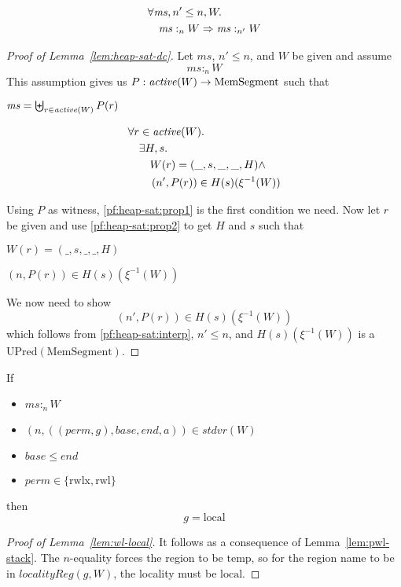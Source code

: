 \documentclass[a4paper]{article}
\newcommand{\fun}{\rightarrow}
\newcommand{\var}[1]{\mathit{#1}}
\newcommand{\hs}{\var{ms}}
\newcommand{\ms}{\hs}
\newcommand{\gl}{\var{g}}
\newcommand{\addr}{\var{a}}
\newcommand{\start}{\var{base}}
\newcommand{\addrend}{\var{end}}
\newcommand{\heap}{\var{mem}}
\newcommand{\perm}{\var{perm}}
\newcommand{\stdcap}[1][(\perm,\gl)]{\left(#1,\start,\addrend,\addr \right)}
\newcommand{\plainfun}[2]{
  \ifthenelse{\equal{#2}{}}
  {\mathit{#1}}
  {\mathit{#1}(#2)}
}
\newcommand{\activeReg}[1]{\plainfun{active}{#1}}
\newcommand{\heapSat}[3][\heap]{#1 :_{#2} #3}
\newcommand{\memSat}[3][n]{\heapSat[#2]{#1}{#3}}
\newcommand{\plaindom}[1]{\mathrm{#1}}
\newcommand{\HeapSegments}{\plaindom{MemSegment}}
\newcommand{\MemSegments}{\HeapSegments}
\newcommand{\UPred}[1]{\plaindom{UPred}(#1)}
\newcommand{\npair}[2][n]{\left(#1,#2 \right)}
\newcommand{\plainperm}[1]{\mathrm{#1}}
\newcommand{\readwritel}{\plainperm{rwl}}
\newcommand{\rwl}{\readwritel}
\newcommand{\rwlx}{\plainperm{rwlx}}
\newcommand{\local}{\plainperm{local}}
\newcommand{\localityReg}{\var{localityReg}}
\newcommand{\plainview}[1]{\mathrm{#1}}
\newcommand{\temp}{\plainview{temp}}
\begin{document}
\begin{lemma}
  \label{lem:heap-sat-dc}
  \begin{align*}
    &\forall \hs, n' \leq n, W \ldotp \\
    &\quad \heapSat[\hs]{n}{W} \Rightarrow \heapSat[\hs]{n'}{W}
  \end{align*}
\end{lemma} 
\begin{proof}[Proof of Lemma~\ref{lem:heap-sat-dc}]
  Let $\ms$, $n' \leq n$, and $W$ be given and assume
  \[
    \heapSat[\hs]{n}{W}
  \]
  This assumption gives us $P : \activeReg{W} \fun \MemSegments$ such that
  \begin{enumproof}
    \item $\hs = \biguplus_{r\in\activeReg{W}}P(r)$ \label{pf:heap-sat:prop1}
    \item \label{pf:heap-sat:prop2}
      \begin{align*}
        &\forall r \in \activeReg{W} \ldotp\\
        &\quad \exists H,s \ldotp\\
        &\qquad W(r) = (\_,s,\_,\_,H) \land \\
        &\qquad \npair[n']{P(r)} \in H(s)(\xi^{-1}(W))
      \end{align*}
  \end{enumproof}
  Using $P$ as witness, \ref{pf:heap-sat:prop1} is the first condition we need. Now let $r$ be given and use \ref{pf:heap-sat:prop2} to get $H$ and $s$ such that
  \begin{enumproof}[resume]
    \item $W(r) = (\_,s,\_,\_,H)$ 
    \item $\npair[n]{P(r)} \in H(s)(\xi^{-1}(W))$ \label{pf:heap-sat:interp}
  \end{enumproof}
We now need to show
\[
        \npair[n']{P(r)} \in H(s)(\xi^{-1}(W))
\]
which follows from \ref{pf:heap-sat:interp}, $n' \leq n$, and $H(s)(\xi^{-1}(W))$ is a $\UPred{\MemSegments}$.
\end{proof}

\begin{lemma}
  \label{lem:wl-local}
  If
  \begin{itemize}
  \item $\memSat{\ms}{W}$
  \item $\npair{\stdcap} \in stdvr(W)$
  \item $\start \leq \addrend$
  \item $\perm \in \{\rwlx,\rwl\}$
  \end{itemize}
  then 
  \[
    \gl = \local
  \]
\end{lemma}
\begin{proof}[Proof of Lemma~\ref{lem:wl-local}]
It follows as a consequence of Lemma~\ref{lem:pwl-stack}. The $n$-equality forces the region to be $\temp$, so for the region name to be in $\localityReg(\gl,W)$, the locality must be $\local$.
\end{proof}
\end{document}
